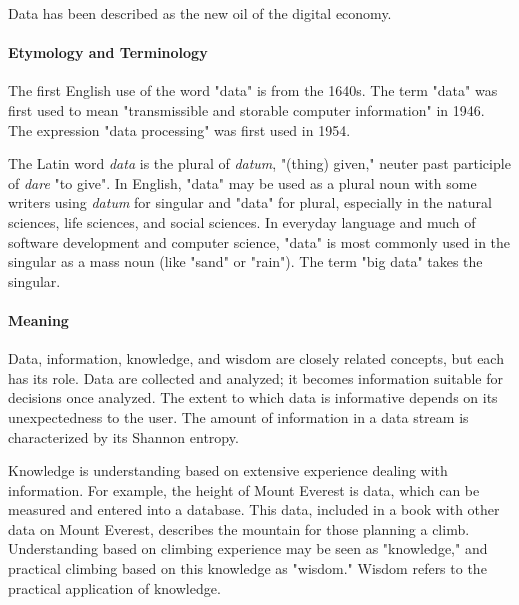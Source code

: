 Data has been described as the new oil of the digital economy.





\paragraph{Etymology and Terminology}



The first English use of the word "data" is from the 1640s. The term "data" was first used to mean "transmissible and storable computer information" in 1946. The expression "data processing" was first used in 1954.



The Latin word \textit{data} is the plural of \textit{datum}, "(thing) given," neuter past participle of \textit{dare} "to give". In English, "data" may be used as a plural noun with some writers using \textit{datum} for singular and "data" for plural, especially in the natural sciences, life sciences, and social sciences. In everyday language and much of software development and computer science, "data" is most commonly used in the singular as a mass noun (like "sand" or "rain"). The term "big data" takes the singular.



\paragraph{Meaning}



Data, information, knowledge, and wisdom are closely related concepts, but each has its role. Data are collected and analyzed; it becomes information suitable for decisions once analyzed. The extent to which data is informative depends on its unexpectedness to the user. The amount of information in a data stream is characterized by its Shannon entropy.



Knowledge is understanding based on extensive experience dealing with information. For example, the height of Mount Everest is data, which can be measured and entered into a database. This data, included in a book with other data on Mount Everest, describes the mountain for those planning a climb. Understanding based on climbing experience may be seen as "knowledge," and practical climbing based on this knowledge as "wisdom." Wisdom refers to the practical application of knowledge.



